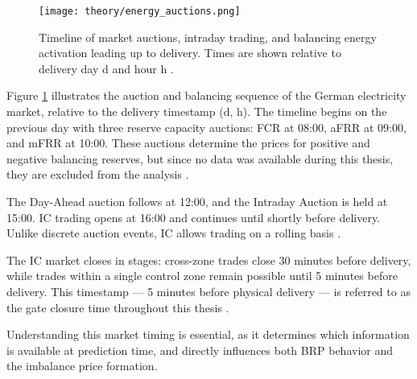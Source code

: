 \documentclass[class=scrbook, crop=false]{standalone}
\begin{document}
\begin{figure}[ht]
            \centering
            \texttt{[image: theory/energy\_auctions.png]}
            \caption[Timeschedule for energy market auctions]{Timeline of market auctions, intraday trading, and balancing energy activation leading up to delivery. Times are shown relative to delivery day 
d and hour 
h \cite{narajewskiProbabilisticForecastingGerman2022}.}
            \label{fig::energy_auctions}
 \end{figure}

Figure \ref{fig::energy_auctions} illustrates the auction and balancing sequence of the German electricity market, relative to the delivery timestamp (d, h).
The timeline begins on the previous day with three reserve capacity auctions:  \gls{FCR} at 08:00, aFRR at 09:00, and  \gls{mFRR} at 10:00. These auctions determine the prices for positive and negative balancing reserves, but since no data was available during this thesis, they are excluded from the analysis \cite{narajewskiProbabilisticForecastingGerman2022} .

The Day-Ahead auction follows at 12:00, and the Intraday Auction is held at 15:00.  \gls{IC} trading opens at 16:00 and continues until shortly before delivery. Unlike discrete auction events, \gls{IC} allows trading on a rolling basis \cite{EPEXTradingBrochure} \cite{narajewskiProbabilisticForecastingGerman2022} \cite{EPEXTradingBrochure}.

The \gls{IC} market closes in stages: cross-zone trades close 30 minutes before delivery, while trades within a single control zone remain possible until 5 minutes before delivery. This timestamp — 5 minutes before physical delivery — is referred to as the gate closure time throughout this thesis \cite{narajewskiProbabilisticForecastingGerman2022}  \cite{EPEXTradingBrochure}.

Understanding this market timing is essential, as it determines which information is available at prediction time, and directly influences both \gls{BRP} behavior and the imbalance price formation.

 
 
\end{document}
